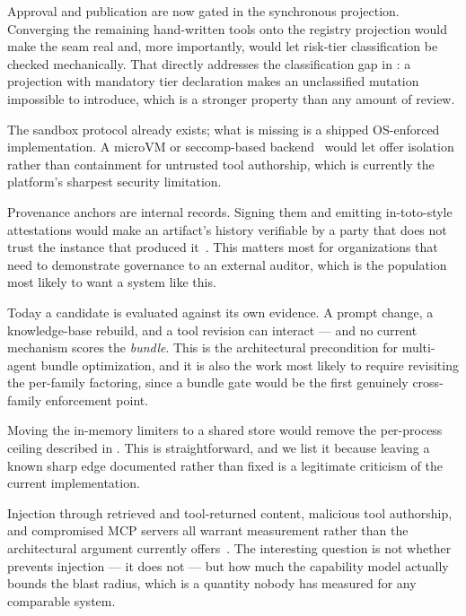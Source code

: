  Approval and publication are now gated in
the synchronous projection. Converging the remaining \statAriaTools{} hand-written
tools onto the registry projection would make the seam real and, more importantly,
would let risk-tier classification be checked mechanically. That directly addresses
the classification gap in : a projection with mandatory tier
declaration makes an unclassified mutation impossible to introduce, which is a
stronger property than any amount of review.

 The sandbox protocol already exists; what
is missing is a shipped OS-enforced implementation. A microVM or seccomp-based
backend~\cite{agache2020firecracker,bubblewrap} would let \sys offer isolation rather
than containment for untrusted tool authorship, which is currently the platform's
sharpest security limitation.

 Provenance anchors are internal records. Signing them
and emitting in-toto-style attestations would make an artifact's history verifiable
by a party that does not trust the \sys instance that produced
it~\cite{torresarias2019intoto,slsa}. This matters most for organizations that need
to demonstrate governance to an external auditor, which is the population most likely
to want a system like this.

 Today a candidate is evaluated against its own
evidence. A prompt change, a knowledge-base rebuild, and a tool revision can
interact --- and no current mechanism scores the \emph{bundle}. This is the
architectural precondition for multi-agent bundle optimization, and it is also the
work most likely to require revisiting the per-family factoring, since a bundle gate
would be the first genuinely cross-family enforcement point.

 Moving the in-memory limiters to a shared store would
remove the per-process ceiling described in . This is
straightforward, and we list it because leaving a known sharp edge documented rather
than fixed is a legitimate criticism of the current implementation.

 Injection through retrieved and tool-returned
content, malicious tool authorship, and compromised MCP servers all warrant
measurement rather than the architectural argument  currently
offers~\cite{greshake2023injection}. The interesting question is not whether \sys
prevents injection --- it does not --- but how much the capability model actually
bounds the blast radius, which is a quantity nobody has measured for any comparable
system.

